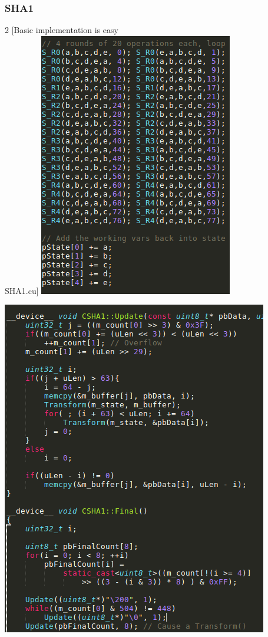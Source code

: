 \documentclass{beamer}
\begin{document}
\begin{frame}
	\frametitle{SHA1}
	\begin{multicols}{2}
	[\centering Basic implementation is easy\\
	SHA1.cu]
		\includegraphics[height=.75\textheight]{sha1_1.png}

		\includegraphics[height=.7\textheight]{sha1_2.png}
	\end{multicols}
\end{frame}
\end{document}
